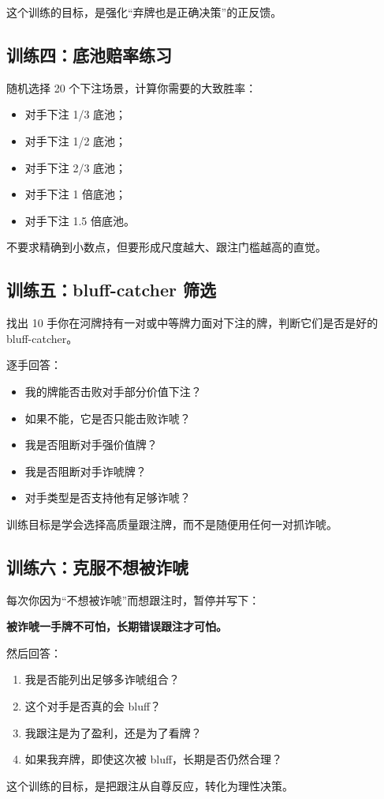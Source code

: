 这个训练的目标，是强化“弃牌也是正确决策”的正反馈。

\subsection*{训练四：底池赔率练习}

随机选择 20 个下注场景，计算你需要的大致胜率：

\begin{itemize}
\item 对手下注 1/3 底池；
\item 对手下注 1/2 底池；
\item 对手下注 2/3 底池；
\item 对手下注 1 倍底池；
\item 对手下注 1.5 倍底池。
\end{itemize}

不要求精确到小数点，但要形成尺度越大、跟注门槛越高的直觉。

\subsection*{训练五：bluff-catcher 筛选}

找出 10 手你在河牌持有一对或中等牌力面对下注的牌，判断它们是否是好的 bluff-catcher。

逐手回答：

\begin{itemize}
\item 我的牌能否击败对手部分价值下注？
\item 如果不能，它是否只能击败诈唬？
\item 我是否阻断对手强价值牌？
\item 我是否阻断对手诈唬牌？
\item 对手类型是否支持他有足够诈唬？
\end{itemize}

训练目标是学会选择高质量跟注牌，而不是随便用任何一对抓诈唬。

\subsection*{训练六：克服不想被诈唬}

每次你因为“不想被诈唬”而想跟注时，暂停并写下：

\begin{center}
\textbf{被诈唬一手牌不可怕，长期错误跟注才可怕。}
\end{center}

然后回答：

\begin{enumerate}
\item 我是否能列出足够多诈唬组合？
\item 这个对手是否真的会 bluff？
\item 我跟注是为了盈利，还是为了看牌？
\item 如果我弃牌，即使这次被 bluff，长期是否仍然合理？
\end{enumerate}

这个训练的目标，是把跟注从自尊反应，转化为理性决策。
